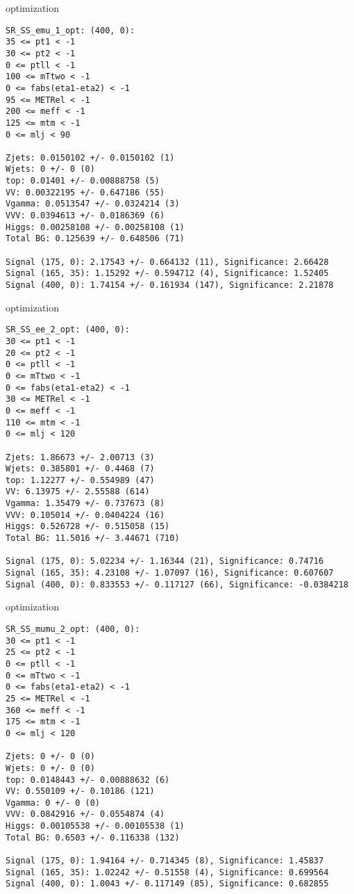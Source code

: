 \begin{frame}[fragile]{optimization}
\tiny
\begin{verbatim}
SR_SS_emu_1_opt: (400, 0):
35 <= pt1 < -1
30 <= pt2 < -1
0 <= ptll < -1
100 <= mTtwo < -1
0 <= fabs(eta1-eta2) < -1
95 <= METRel < -1
200 <= meff < -1
125 <= mtm < -1
0 <= mlj < 90

Zjets: 0.0150102 +/- 0.0150102 (1)
Wjets: 0 +/- 0 (0)
top: 0.01401 +/- 0.00888758 (5)
VV: 0.00322195 +/- 0.647186 (55)
Vgamma: 0.0513547 +/- 0.0324214 (3)
VVV: 0.0394613 +/- 0.0186369 (6)
Higgs: 0.00258108 +/- 0.00258108 (1)
Total BG: 0.125639 +/- 0.648506 (71)

Signal (175, 0): 2.17543 +/- 0.664132 (11), Significance: 2.66428
Signal (165, 35): 1.15292 +/- 0.594712 (4), Significance: 1.52405
Signal (400, 0): 1.74154 +/- 0.161934 (147), Significance: 2.21878
\end{verbatim}
\end{frame}

\begin{frame}[fragile]{optimization}
\tiny
\begin{verbatim}
SR_SS_ee_2_opt: (400, 0):
30 <= pt1 < -1
20 <= pt2 < -1
0 <= ptll < -1
0 <= mTtwo < -1
0 <= fabs(eta1-eta2) < -1
30 <= METRel < -1
0 <= meff < -1
110 <= mtm < -1
0 <= mlj < 120

Zjets: 1.86673 +/- 2.00713 (3)
Wjets: 0.385801 +/- 0.4468 (7)
top: 1.12277 +/- 0.554989 (47)
VV: 6.13975 +/- 2.55588 (614)
Vgamma: 1.35479 +/- 0.737673 (8)
VVV: 0.105014 +/- 0.0404224 (16)
Higgs: 0.526728 +/- 0.515058 (15)
Total BG: 11.5016 +/- 3.44671 (710)

Signal (175, 0): 5.02234 +/- 1.16344 (21), Significance: 0.74716
Signal (165, 35): 4.23108 +/- 1.07097 (16), Significance: 0.607607
Signal (400, 0): 0.833553 +/- 0.117127 (66), Significance: -0.0384218
\end{verbatim}
\end{frame}

\begin{frame}[fragile]{optimization}
\tiny
\begin{verbatim}
SR_SS_mumu_2_opt: (400, 0):
30 <= pt1 < -1
25 <= pt2 < -1
0 <= ptll < -1
0 <= mTtwo < -1
0 <= fabs(eta1-eta2) < -1
25 <= METRel < -1
360 <= meff < -1
175 <= mtm < -1
0 <= mlj < 120

Zjets: 0 +/- 0 (0)
Wjets: 0 +/- 0 (0)
top: 0.0148443 +/- 0.00888632 (6)
VV: 0.550109 +/- 0.10186 (121)
Vgamma: 0 +/- 0 (0)
VVV: 0.0842916 +/- 0.0554874 (4)
Higgs: 0.00105538 +/- 0.00105538 (1)
Total BG: 0.6503 +/- 0.116338 (132)

Signal (175, 0): 1.94164 +/- 0.714345 (8), Significance: 1.45837
Signal (165, 35): 1.02242 +/- 0.51558 (4), Significance: 0.699564
Signal (400, 0): 1.0043 +/- 0.117149 (85), Significance: 0.682855
\end{verbatim}
\end{frame}

